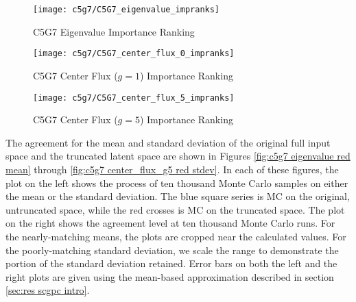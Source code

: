 \begin{figure}[H]
  \centering
  \texttt{[image: c5g7/C5G7\_eigenvalue\_impranks]}
  \caption{C5G7 Eigenvalue Importance Ranking}
  \label{fig:c5g7 eigenvalue imprank}
\end{figure}
\begin{figure}[H]
  \centering
  \texttt{[image: c5g7/C5G7\_center\_flux\_0\_impranks]}
  \caption{C5G7 Center Flux ($g=1$) Importance Ranking}
  \label{fig:c5g7 flux 0 imprank}
\end{figure}
\begin{figure}[H]
  \centering
  \texttt{[image: c5g7/C5G7\_center\_flux\_5\_impranks]}
  \caption{C5G7 Center Flux ($g=5$) Importance Ranking}
  \label{fig:c5g7 flux 5 imprank}
\end{figure}

The agreement for the mean and standard deviation of the original full input space and the truncated latent
space are shown in Figures \ref{fig:c5g7 eigenvalue red mean} through \ref{fig:c5g7 center_flux_g5 red stdev}.
In each of these figures, the plot on the left shows the process of ten thousand Monte Carlo samples on either
the mean or the standard deviation.  The blue square series is MC on the original, untruncated space, while the red
crosses is MC on the truncated space.  The plot on the right shows the agreement level at ten thousand Monte
Carlo runs.  For the nearly-matching means, the plots are cropped near the calculated values.  For the
poorly-matching standard deviation, we scale the range to demonstrate the portion of the standard deviation
retained. Error bars on both the left and the right plots are given using the mean-based approximation described
in section \ref{sec:res scgpc intro}. 

